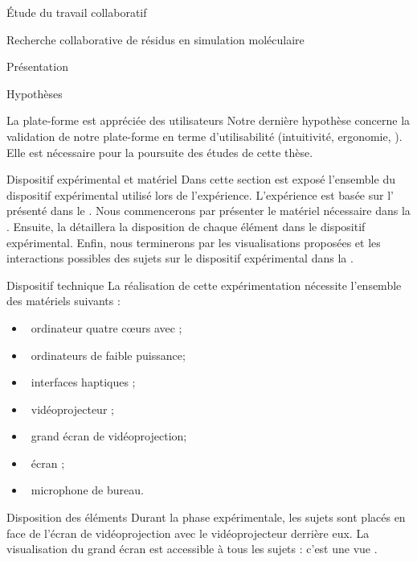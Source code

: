 \documentclass[myfrancais]{mythesis}
\begin{document}
\begin{mypart}{Étude du travail collaboratif}
\begin{mychapter}{Recherche collaborative de résidus en simulation moléculaire}
\begin{mysection}{Présentation}
\begin{mysubsection}{Hypothèses}
\begin{myparagraph}{ La plate-forme est appréciée des utilisateurs}
						Notre dernière hypothèse concerne la validation de notre plate-forme en terme d'utilisabilité (intuitivité, ergonomie, \myetc).
						Elle est nécessaire pour la poursuite des études de cette thèse.
					\end{myparagraph}
				\end{mysubsection}
			\end{mysection}
			\begin{mysection}{Dispositif expérimental et matériel}
				Dans cette section est exposé l'ensemble du dispositif expérimental utilisé lors de l'expérience.
				L'expérience est basée sur l' présenté dans le .
				Nous commencerons par présenter le matériel nécessaire dans la .
				Ensuite, la  détaillera la disposition de chaque élément dans le dispositif expérimental.
				Enfin, nous terminerons par les visualisations proposées et les interactions possibles des sujets sur le dispositif expérimental dans la .
				\begin{mysubsection}{Dispositif technique}
					La réalisation de cette expérimentation nécessite l'ensemble des matériels suivants :
					\begin{itemize}
						\item {}~ordinateur quatre cœurs \myIntelCore avec ;
						\item {}~ordinateurs de faible puissance;
						\item {}~interfaces haptiques \myOmni;
						\item {}~vidéoprojecteur \myCasioXJ;
						\item {}~grand écran de vidéoprojection;
						\item {}~écran \myLCD {};
						\item {}~microphone de bureau.
					\end{itemize}
				\end{mysubsection}
				\begin{mysubsection}{Disposition des éléments}
					Durant la phase expérimentale, les sujets sont placés en face de l'écran de vidéoprojection avec le vidéoprojecteur derrière eux.
					La visualisation du grand écran est accessible à tous les sujets : c'est une vue .

\end{mysubsection}
\end{mysection}
\end{mychapter}
\end{mypart}
\end{document}
